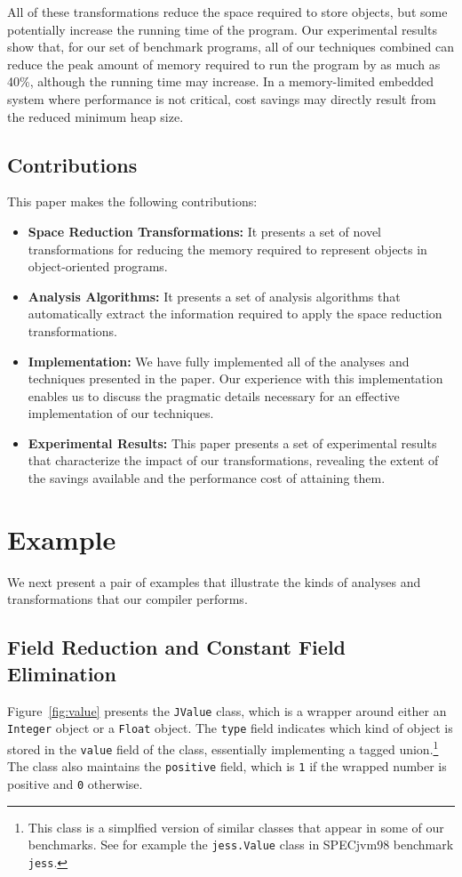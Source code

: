 \documentclass{acmconf}
\begin{document}
All of these transformations reduce the space required to store
objects, but some potentially increase the running time of the program.
Our experimental results show that, for our set of benchmark
programs, all of our techniques combined can reduce the peak amount of memory
required to run the program by as much as 40\%, although the running
time may increase.  In a memory-limited embedded system where
performance is not critical, cost savings may directly result from the
reduced minimum heap size.

\subsection{Contributions}

This paper makes the following contributions:
\begin{itemize}
\item {\bf Space Reduction Transformations:} It presents a set
of novel transformations for reducing the memory required to 
represent objects in object-oriented programs.

\item {\bf Analysis Algorithms:} It presents a set of 
analysis algorithms that automatically extract the 
information required to apply the space reduction 
transformations.

\item {\bf Implementation:} We have fully 
implemented all of the analyses and techniques 
presented in the paper. Our experience with this
implementation enables us to discuss the pragmatic
details necessary for an effective implementation 
of our techniques. 

\item {\bf Experimental Results:} This paper presents a set
of experimental results that characterize the impact
of our transformations, revealing the extent of the
savings available and the performance cost of attaining them.
\end{itemize}
%
\section{Example}
%
We next present a pair of examples that illustrate the kinds of 
analyses and transformations that our compiler performs.
%
\subsection{Field Reduction and Constant Field Elimination}
%
Figure~\ref{fig:value} presents the {\tt JValue} class, which is 
a wrapper around either an {\tt Integer} object or a {\tt Float}
object. The {\tt type} field indicates which kind of object
is stored in the {\tt value} field of the class, 
essentially implementing a tagged 
union.\footnote{This class is a simplfied version of similar
classes that appear in some of our benchmarks.
See for example the {\tt jess.Value} class in SPECjvm98 benchmark
{\tt jess}.} 
The class also maintains the {\tt positive} field, which is
{\tt 1} if the wrapped number is positive and {\tt 0} otherwise. 
\end{document}
